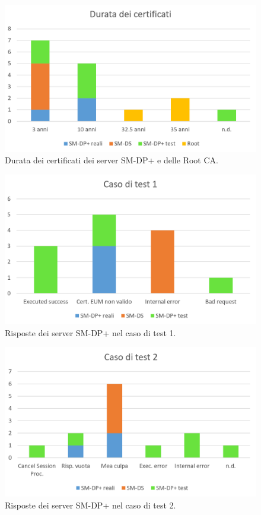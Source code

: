 \documentclass[10pt, oneside]{book}
\begin{document}
\begin{figure}
\includegraphics[width=\linewidth]{cert-duration.png}
\caption{Durata dei certificati dei server SM-DP+ e delle Root CA.}
\label{fig:cert-duration}
\end{figure}
\begin{figure}
\includegraphics[width=\linewidth]{test-1.png}
\caption{Risposte dei server SM-DP+ nel caso di test 1.}
\label{fig:test-1}
\end{figure}
\begin{figure}
\includegraphics[width=\linewidth]{test-2.png}
\caption{Risposte dei server SM-DP+ nel caso di test 2.}
\label{fig:test-2}
\end{figure}
\end{document}
